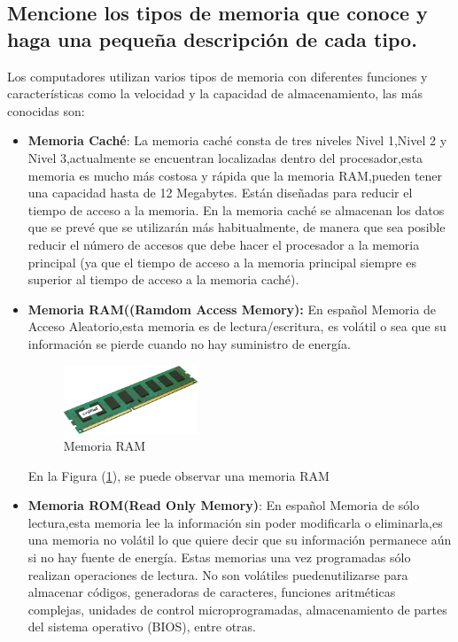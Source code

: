 \documentclass{article}
\begin{document}
\subsection{Mencione los tipos de memoria que conoce y haga una pequeña descripción de cada tipo.}
Los computadores utilizan varios tipos de memoria con diferentes funciones y características como la velocidad y la capacidad de almacenamiento, las más conocidas son:
\begin{itemize}
\item \textbf{Memoria Caché}:
    La memoria caché consta de tres niveles Nivel 1,Nivel 2 y Nivel 3,actualmente se encuentran localizadas dentro del procesador,esta memoria es mucho más costosa y rápida que la memoria RAM,pueden tener una capacidad hasta de 12 Megabytes.\newline
    Están diseñadas para reducir el tiempo de acceso a la memoria. En la memoria caché se almacenan los datos que se prevé que se utilizarán más habitualmente, de manera que sea posible reducir el número de accesos que debe hacer el procesador a la memoria principal (ya que el tiempo de acceso a la memoria principal siempre es superior al tiempo de acceso a la memoria caché).\cite{Orenga}

    \item \textbf{Memoria RAM((Ramdom Access Memory): }En español Memoria de Acceso Aleatorio,esta memoria es de lectura/escritura, es volátil o sea que su información se pierde cuando no hay suministro de energía.
    
    
    \begin{figure}[h]
    \includegraphics[width=4cm]{memoria.png}
    \centering
    \caption{Memoria RAM}
    \label{fig:memoria}
    \end{figure}
    
    En la Figura (\ref{fig:memoria}), se puede observar una memoria RAM
    
    \item \textbf{Memoria ROM(Read Only Memory)}: En español Memoria de sólo lectura,esta memoria lee la información sin poder modificarla o eliminarla,es una memoria no volátil lo que quiere decir que su información permanece aún si no hay fuente de energía.\newline
    Estas memorias una vez programadas sólo realizan operaciones de lectura. No son volátiles puedenutilizarse para almacenar códigos, generadoras de caracteres, funciones aritméticas complejas, unidades de control microprogramadas, almacenamiento de partes del sistema operativo (BIOS), entre otras.\cite{UNT2}
    

\end{itemize}
\end{document}
